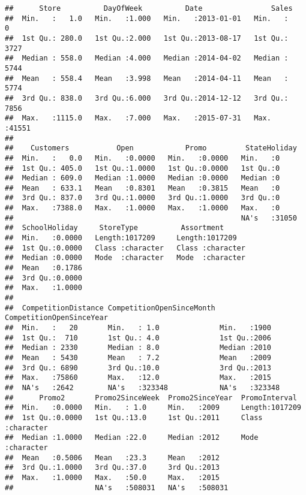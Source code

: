 \documentclass[]{article}
\begin{document}
\begin{verbatim}
##      Store          DayOfWeek          Date                Sales      
##  Min.   :   1.0   Min.   :1.000   Min.   :2013-01-01   Min.   :    0  
##  1st Qu.: 280.0   1st Qu.:2.000   1st Qu.:2013-08-17   1st Qu.: 3727  
##  Median : 558.0   Median :4.000   Median :2014-04-02   Median : 5744  
##  Mean   : 558.4   Mean   :3.998   Mean   :2014-04-11   Mean   : 5774  
##  3rd Qu.: 838.0   3rd Qu.:6.000   3rd Qu.:2014-12-12   3rd Qu.: 7856  
##  Max.   :1115.0   Max.   :7.000   Max.   :2015-07-31   Max.   :41551  
##                                                                       
##    Customers           Open            Promo         StateHoliday  
##  Min.   :   0.0   Min.   :0.0000   Min.   :0.0000   Min.   :0      
##  1st Qu.: 405.0   1st Qu.:1.0000   1st Qu.:0.0000   1st Qu.:0      
##  Median : 609.0   Median :1.0000   Median :0.0000   Median :0      
##  Mean   : 633.1   Mean   :0.8301   Mean   :0.3815   Mean   :0      
##  3rd Qu.: 837.0   3rd Qu.:1.0000   3rd Qu.:1.0000   3rd Qu.:0      
##  Max.   :7388.0   Max.   :1.0000   Max.   :1.0000   Max.   :0      
##                                                     NA's   :31050  
##  SchoolHoliday     StoreType          Assortment       
##  Min.   :0.0000   Length:1017209     Length:1017209    
##  1st Qu.:0.0000   Class :character   Class :character  
##  Median :0.0000   Mode  :character   Mode  :character  
##  Mean   :0.1786                                        
##  3rd Qu.:0.0000                                        
##  Max.   :1.0000                                        
##                                                        
##  CompetitionDistance CompetitionOpenSinceMonth CompetitionOpenSinceYear
##  Min.   :   20       Min.   : 1.0              Min.   :1900            
##  1st Qu.:  710       1st Qu.: 4.0              1st Qu.:2006            
##  Median : 2330       Median : 8.0              Median :2010            
##  Mean   : 5430       Mean   : 7.2              Mean   :2009            
##  3rd Qu.: 6890       3rd Qu.:10.0              3rd Qu.:2013            
##  Max.   :75860       Max.   :12.0              Max.   :2015            
##  NA's   :2642        NA's   :323348            NA's   :323348          
##      Promo2       Promo2SinceWeek  Promo2SinceYear  PromoInterval     
##  Min.   :0.0000   Min.   : 1.0     Min.   :2009     Length:1017209    
##  1st Qu.:0.0000   1st Qu.:13.0     1st Qu.:2011     Class :character  
##  Median :1.0000   Median :22.0     Median :2012     Mode  :character  
##  Mean   :0.5006   Mean   :23.3     Mean   :2012                       
##  3rd Qu.:1.0000   3rd Qu.:37.0     3rd Qu.:2013                       
##  Max.   :1.0000   Max.   :50.0     Max.   :2015                       
##                   NA's   :508031   NA's   :508031
\end{verbatim}
\end{document}
